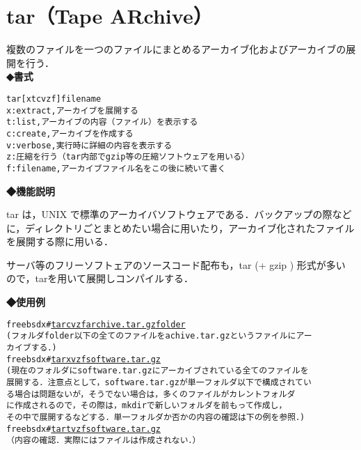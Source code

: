 
\section{tar（Tape ARchive）}
複数のファイルを一つのファイルにまとめるアーカイブ化およびアーカイブの展
開を行う．\\
\label{cmd:tar}
\noindent
{\bf ◆書式}
\begin{center}
\begin{screen}
\begin{alltt}
tar [xtcvzf] filename
  x : extract, アーカイブを展開する
  t : list, アーカイブの内容（ファイル）を表示する
  c : create, アーカイブを作成する
  v : verbose, 実行時に詳細の内容を表示する
  z : 圧縮を行う（tar 内部で gzip 等の圧縮ソフトウェアを用いる）
  f : filename, アーカイブファイル名をこの後に続いて書く
\end{alltt}
\end{screen}
\end{center}

\noindent
{\bf ◆機能説明}

tar は，UNIX で標準のアーカイバソフトウェアである．バックアップの際など
に，ディレクトリごとまとめたい場合に用いたり，アーカイブ化されたファイル
を展開する際に用いる．

サーバ等のフリーソフトェアのソースコード配布も，tar (+ gzip ) 形式が多い
ので，tarを用いて展開しコンパイルする．

\noindent
{\bf ◆使用例}
\begin{center}
\begin{breakbox}
\begin{alltt}
freebsdx# \underline{tar cvzf archive.tar.gz folder}
(フォルダ folder 以下の全てのファイルを achive.tar.gz というファイルにアー
 カイブする．)
freebsdx# \underline{tar xvzf software.tar.gz}
(現在のフォルダに software.tar.gz にアーカイブされている全てのファイルを
 展開する．注意点として，software.tar.gz が単一フォルダ以下で構成されてい
 る場合は問題ないが，そうでない場合は，多くのファイルがカレントフォルダ
 に作成されるので，その際は，mkdir で新しいフォルダを前もって作成し，
 その中で展開するなどする．単一フォルダか否かの内容の確認は下の例を参照．)
freebsdx# \underline{tar tvzf software.tar.gz}
  （内容の確認．実際にはファイルは作成されない．）
\end{alltt}
\end{breakbox}
\end{center}
\clearpage
